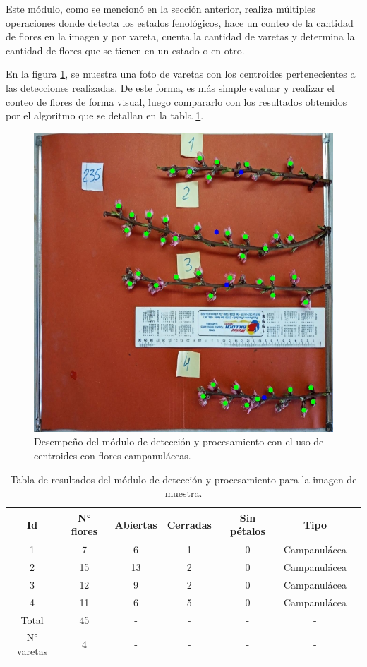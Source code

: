Este módulo, como se mencionó en la sección anterior, realiza múltiples operaciones donde detecta los estados fenológicos, hace un conteo de la cantidad de flores en la imagen y por vareta, cuenta la cantidad de varetas y determina la cantidad de flores que se tienen en un estado o en otro.

En la figura \ref{fig:DesempeñoMod2}, se muestra una foto de varetas con los centroides pertenecientes a las detecciones realizadas. De este forma, es más simple evaluar y realizar el conteo de flores de forma visual, luego compararlo con los resultados obtenidos por el algoritmo que se detallan en la tabla \ref{tab:resultadosmod2}.

\begin{figure}[ht]
	\centering
	\includegraphics[scale=0.5]{./Figures/centroids3.jpeg}
	\caption{Desempeño del módulo de detección y procesamiento con el uso de centroides con flores campanuláceas.}
	\label{fig:DesempeñoMod2}
\end{figure}


\begin{table}[h]
	\centering
	\caption{Tabla de resultados del módulo de detección y procesamiento para la imagen de muestra.}
	\begin{tabular}{c c c c c c c}    
		\toprule
		\textbf{Id}&\textbf{N° flores}&\textbf{Abiertas}&\textbf{Cerradas}&\textbf{Sin pétalos} &\textbf{Tipo}\\
		\midrule
		1 & 7 & 6 & 1 & 0 &  Campanulácea\\
		2 & 15 & 13 & 2 & 0 &  Campanulácea\\
		3 & 12 & 9 & 2 & 0 &  Campanulácea\\
		4 & 11 & 6 & 5 & 0 &  Campanulácea\\
		Total & 45 & - & - &  - & - \\
		N° varetas & 4 & - &  - & - & - \\
		\bottomrule
		\hline
	\end{tabular}
	\label{tab:resultadosmod2}
\end{table}


